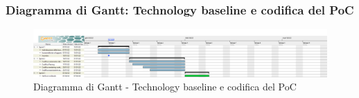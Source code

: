 \subsubsection{Diagramma di Gantt: Technology baseline e codifica del PoC}
\begin{figure}[h!]
    \centering
    \includegraphics[scale=0.22]{../../assets/Diagrammi_Gantt/TB.png}
    \caption{Diagramma di Gantt - Technology baseline e codifica del PoC}
\end{figure}